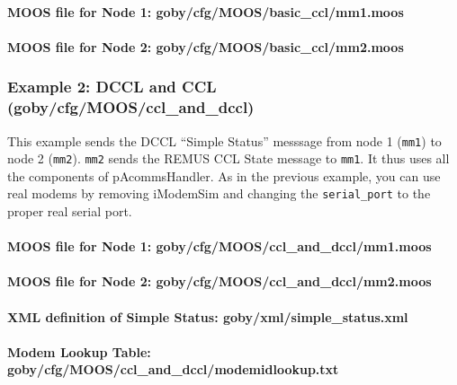 \documentclass[11pt, letterpaper, oneside]{memoir}
\begin{document}
\paragraph{MOOS file for Node 1: goby/cfg/MOOS/basic\_ccl/mm1.moos}
\resetbvlinenumber

\paragraph{MOOS file for Node 2: goby/cfg/MOOS/basic\_ccl/mm2.moos}
\resetbvlinenumber

\subsubsection{Example 2: DCCL and CCL (goby/cfg/MOOS/ccl\_and\_dccl)}
This example sends the DCCL ``Simple Status'' messsage from node 1 (\verb|mm1|) to node 2 (\verb|mm2|). \verb|mm2| sends the REMUS CCL State message to \verb|mm1|. It thus uses all the components of pAcommsHandler. As in the previous example, you can use real modems by removing iModemSim and changing the \verb|serial_port| to the proper real serial port.

\paragraph{MOOS file for Node 1: goby/cfg/MOOS/ccl\_and\_dccl/mm1.moos}
\resetbvlinenumber

\paragraph{MOOS file for Node 2: goby/cfg/MOOS/ccl\_and\_dccl/mm2.moos}
\resetbvlinenumber

\paragraph{XML definition of Simple Status: goby/xml/simple\_status.xml}
\resetbvlinenumber

\paragraph{Modem Lookup Table: goby/cfg/MOOS/ccl\_and\_dccl/modemidlookup.txt}
\resetbvlinenumber
\end{document}

